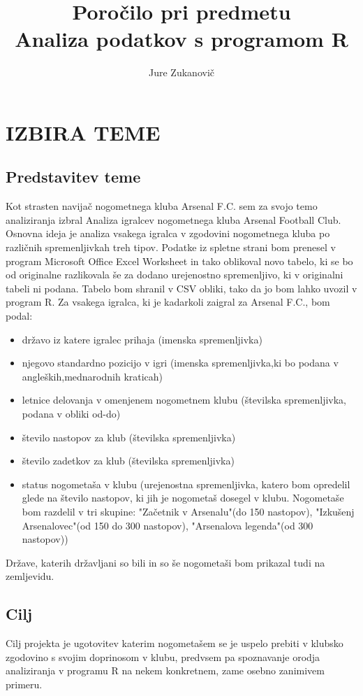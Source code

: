 \documentclass[11pt,a4paper]{article}
\begin{document}
\title{Poročilo pri predmetu \\
Analiza podatkov s programom R}
\author{Jure Zukanovič}
\maketitle

\section{IZBIRA TEME}
\subsection{Predstavitev teme}
Kot strasten navijač nogometnega kluba Arsenal F.C. sem za svojo temo analiziranja izbral Analiza igralcev nogometnega kluba Arsenal Football Club. Osnovna ideja je analiza vsakega igralca v zgodovini nogometnega kluba po različnih spremenljivkah treh tipov. Podatke iz spletne strani bom prenesel v program  Microsoft Office Excel Worksheet in tako oblikoval novo tabelo, ki se bo od originalne razlikovala še za dodano urejenostno spremenljivo, ki v originalni tabeli ni podana. Tabelo bom shranil v CSV obliki, tako da jo bom lahko uvozil v program  R. Za vsakega igralca, ki je kadarkoli zaigral za Arsenal F.C., bom podal: 
\begin{itemize}
\item{državo iz katere igralec prihaja (imenska spremenljivka)}
\item{njegovo standardno pozicijo v igri (imenska spremenljivka,ki bo podana v angleških,mednarodnih kraticah)}
\item{letnice delovanja v omenjenem nogometnem klubu (številska spremenljivka, podana v obliki od-do)}
\item{število nastopov za klub (številska spremenljivka)}
\item{število zadetkov za klub (številska spremenljivka)}
\item{status nogometaša v klubu (urejenostna spremenljivka, katero bom opredelil glede na število nastopov, ki jih je nogometaš dosegel v klubu. Nogometaše bom razdelil v tri skupine: "Začetnik v Arsenalu"(do 150 nastopov), "Izkušenj Arsenalovec"(od 150 do 300 nastopov), "Arsenalova legenda"(od 300 nastopov))}
\end{itemize}
Države, katerih državljani so bili in so še nogometaši bom prikazal tudi na zemljevidu.

\subsection{Cilj}
Cilj projekta je ugotovitev katerim nogometašem se je uspelo prebiti v klubsko zgodovino s svojim doprinosom v klubu, predvsem pa spoznavanje orodja analiziranja v programu R na nekem konkretnem, zame osebno zanimivem primeru. 
\end{document}
